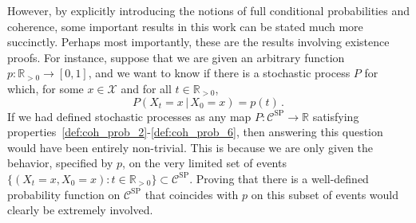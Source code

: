 \documentclass[10pt,a4paper]{paper}
\theoremstyle{definition}
\newcommand{\reals}{\mathbb{R}}
\newcommand{\realspos}{\reals_{>0}}
\newcommand{\states}{\mathcal{X}}
\begin{document}
However, by explicitly introducing the notions of full conditional probabilities and coherence, some important results in this work can be stated much more succinctly. Perhaps most importantly, these are the results involving existence proofs. For instance, suppose that we are given an arbitrary function $p:\realspos\to [0,1]$, and we want to know if there is a stochastic process $P$ for which, for some $x\in\states$ and for all $t\in\realspos$,
\begin{equation*}
P(X_t=x\,\vert\,X_0=x) = p(t)\,.
\end{equation*}
If we had defined stochastic processes as any map $P:\mathcal{C}^\mathrm{SP}\to\reals$ satisfying properties~\ref{def:coh_prob_2}-\ref{def:coh_prob_6}, then answering this question would have been entirely non-trivial. This is because we are only given the behavior, specified by $p$, on the very limited set of events $\{(X_t=x,X_0=x):t\in\realspos\}\subset\mathcal{C}^\mathrm{SP}$. Proving that there is a well-defined probability function on $\mathcal{C}^\mathrm{SP}$ that coincides with $p$ on this subset of events would clearly be extremely involved. 
\end{document}
